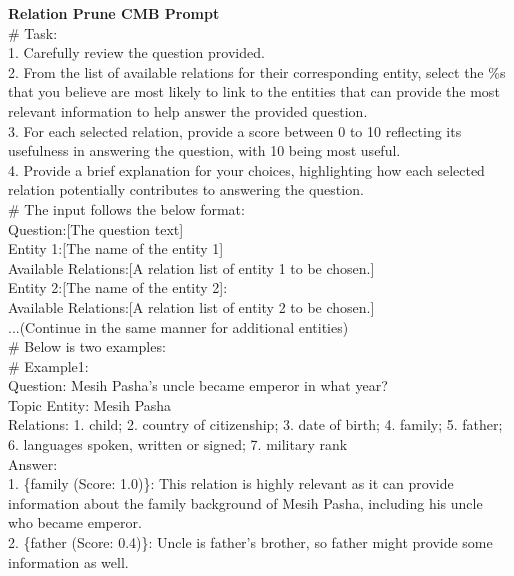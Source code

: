 \documentclass[11pt,UTF8,fontset=fandol]{ctexart}
\begin{document}
\begin{table}[H]\centering
\caption{Relation Prune CMB Prompt（组合式关系剪枝提示词）。}
\label{tab:16}
\end{table}
\vspace{-1.2em}
\begin{promptbox}
\small
\textbf{Relation Prune CMB Prompt}\\
\# Task:\\
1. Carefully review the question provided.\\
2. From the list of available relations for their corresponding entity, select the \%s that you believe are most likely to link to the entities that can provide the most relevant information to help answer the provided question.\\
3. For each selected relation, provide a score between 0 to 10 reflecting its usefulness in answering the question, with 10 being most useful.\\
4. Provide a brief explanation for your choices, highlighting how each selected relation potentially contributes to answering the question.\\[0.3em]
\# The input follows the below format:\\
Question:[The question text]\\
Entity 1:[The name of the entity 1]\\
Available Relations:[A relation list of entity 1 to be chosen.]\\
Entity 2:[The name of the entity 2]:\\
Available Relations:[A relation list of entity 2 to be chosen.]\\
...(Continue in the same manner for additional entities)\\[0.3em]
\# Below is two examples:\\
\# Example1:\\
Question: Mesih Pasha's uncle became emperor in what year?\\
Topic Entity: Mesih Pasha\\
Relations: 1. child; 2. country of citizenship; 3. date of birth; 4. family; 5. father; 6. languages spoken, written or signed; 7. military rank\\
Answer:\\
1. \{family (Score: 1.0)\}: This relation is highly relevant as it can provide information about the family background of Mesih Pasha, including his uncle who became emperor.\\
2. \{father (Score: 0.4)\}: Uncle is father's brother, so father might provide some information as well.\\

\end{promptbox}
\end{document}
